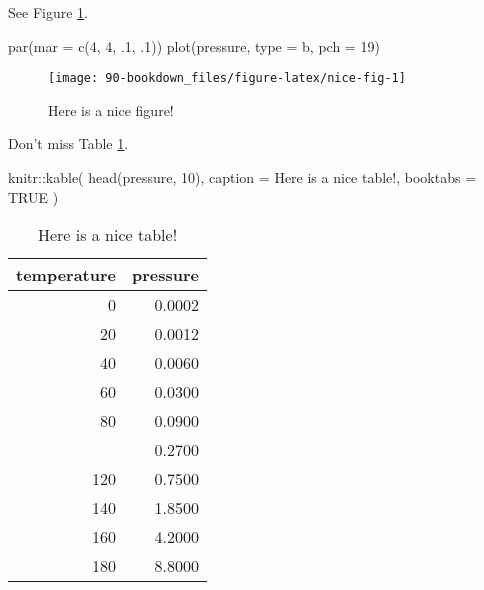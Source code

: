 \documentclass[
]{book}
\newenvironment{Shaded}{\begin{snugshade}}{\end{snugshade}}
\newcommand{\AttributeTok}[1]{\textcolor[rgb]{0.77,0.63,0.00}{#1}}
\newcommand{\ConstantTok}[1]{\textcolor[rgb]{0.00,0.00,0.00}{#1}}
\newcommand{\DecValTok}[1]{\textcolor[rgb]{0.00,0.00,0.81}{#1}}
\newcommand{\FunctionTok}[1]{\textcolor[rgb]{0.00,0.00,0.00}{#1}}
\newcommand{\NormalTok}[1]{#1}
\newcommand{\SpecialCharTok}[1]{\textcolor[rgb]{0.00,0.00,0.00}{#1}}
\newcommand{\StringTok}[1]{\textcolor[rgb]{0.31,0.60,0.02}{#1}}
\theoremstyle{definition}
\theoremstyle{definition}
\theoremstyle{definition}
\theoremstyle{definition}
\theoremstyle{remark}
\begin{document}
See Figure \ref{fig:nice-fig}.

\begin{Shaded}
\begin{Highlighting}[]
\FunctionTok{par}\NormalTok{(}\AttributeTok{mar =} \FunctionTok{c}\NormalTok{(}\DecValTok{4}\NormalTok{, }\DecValTok{4}\NormalTok{, .}\DecValTok{1}\NormalTok{, .}\DecValTok{1}\NormalTok{))}
\FunctionTok{plot}\NormalTok{(pressure, }\AttributeTok{type =} \StringTok{\textquotesingle{}b\textquotesingle{}}\NormalTok{, }\AttributeTok{pch =} \DecValTok{19}\NormalTok{)}
\end{Highlighting}
\end{Shaded}

\begin{figure}

{\centering \texttt{[image: 90-bookdown\_files/figure-latex/nice-fig-1]} 

}

\caption{Here is a nice figure!}\label{fig:nice-fig}
\end{figure}

Don't miss Table \ref{tab:nice-tab}.

\begin{Shaded}
\begin{Highlighting}[]
\NormalTok{knitr}\SpecialCharTok{::}\FunctionTok{kable}\NormalTok{(}
  \FunctionTok{head}\NormalTok{(pressure, }\DecValTok{10}\NormalTok{), }\AttributeTok{caption =} \StringTok{\textquotesingle{}Here is a nice table!\textquotesingle{}}\NormalTok{,}
  \AttributeTok{booktabs =} \ConstantTok{TRUE}
\NormalTok{)}
\end{Highlighting}
\end{Shaded}

\begin{table}

\caption{\label{tab:nice-tab}Here is a nice table!}
\centering
\begin{tabular}[t]{rr}
\toprule
temperature & pressure\\
\midrule
0 & 0.0002\\
20 & 0.0012\\
40 & 0.0060\\
60 & 0.0300\\
80 & 0.0900\\
\addlinespace
100 & 0.2700\\
120 & 0.7500\\
140 & 1.8500\\
160 & 4.2000\\
180 & 8.8000\\
\bottomrule
\end{tabular}
\end{table}
\end{document}
